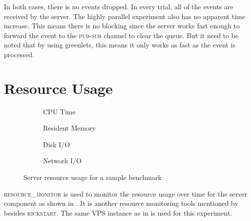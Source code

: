 In both cases, there is no events dropped.
In every trial, all of the events are received by the server.
The highly parallel experiment also has no apparent time increase.
This means there is no blocking since the server works fast enough to forward the event to the \textsc{pub}-\textsc{sub} channel to clear the queue.
But it need to be noted that by using greenlets, this means it only works as fast as the event is processed.


\section{Resource Usage}
\label{sec:eval.resource}

\begin{figure}
	\centering

	\begin{subfigure}{.45\textwidth}
		\centering
		\caption{CPU Time}
		\label{fig:eval.perf.cpu}
	\end{subfigure}%
	\hfill%
	\begin{subfigure}{.45\textwidth}
		\centering
		\caption{Resident Memory}
		\label{fig:eval.perf.rss}
	\end{subfigure}

	\vspace{1cm}

	\begin{subfigure}{.45\textwidth}
		\centering
		\caption{Disk I/O}
		\label{fig:eval.perf.disk}
	\end{subfigure}%
	\hfill%
	\begin{subfigure}{.45\textwidth}
		\centering
		\caption{Network I/O}
		\label{fig:eval.perf.network}
	\end{subfigure}

	\caption{Server resource usage for a sample benchmark}
	\label{fig:eval.perf}
\end{figure}

\textsc{resource\_monitor} \citep{ResourceMonitorCooperative} is used to monitor the resource usage over time for the server component as shown in .
It is another resource monitoring tools mentioned by \citet{juvePracticalResourceMonitoring2015} besides \textsc{kickstart}.
The same VPS instance as in  is used for this experiment.

